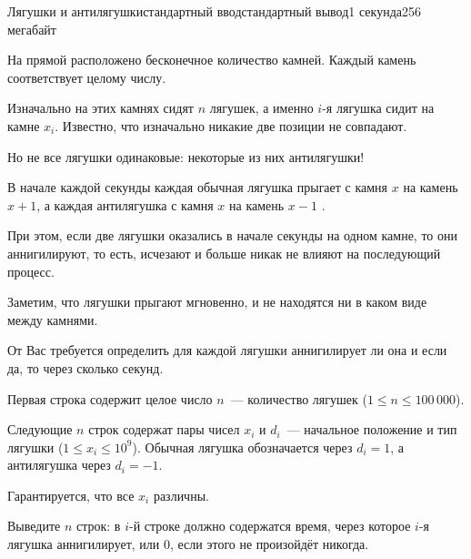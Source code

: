 \begin{problem}{Лягушки и антилягушки}{стандартный ввод}{стандартный вывод}{1 секунда}{256 мегабайт}

На прямой расположено бесконечное количество камней. Каждый камень соответствует целому числу.

Изначально на этих камнях сидят $n$ лягушек, а именно $i$-я лягушка сидит на камне $x_i$. Известно, что изначально никакие две позиции не совпадают.

Но не все лягушки одинаковые: некоторые из них антилягушки!

В начале каждой секунды каждая обычная лягушка прыгает с камня $x$ на камень $x+1$, а каждая антилягушка с камня $x$ на камень $x-1$ .

При этом, если две лягушки оказались в начале секунды на одном камне, то они аннигилируют, то есть, исчезают и больше никак не влияют на последующий процесс.

Заметим, что лягушки прыгают мгновенно, и не находятся ни в каком виде между камнями.

От Вас требуется определить для каждой лягушки аннигилирует ли она и если да, то через сколько секунд.

\InputFile
Первая строка содержит целое число $n$~--- количество лягушек ($1 \leq n \leq 100\,000$).

Следующие $n$ строк содержат пары чисел $x_i$ и $d_i$~--- начальное положение и тип лягушки ($1 \leq x_i \leq 10^9$). Обычная лягушка обозначается через $d_i = 1$, а антилягушка 
через $d_i = -1$.

Гарантируется, что все $x_i$ различны.

\OutputFile
Выведите $n$ строк: в $i$-й строке должно содержатся время, через которое $i$-я лягушка аннигилирует, или $0$, если этого не произойдёт никогда.

\Examples

\begin{example}
%
%
\end{example}

\end{problem}

